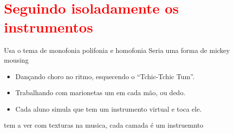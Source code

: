 \newpage

\section{\textcolor{red}{Seguindo isoladamente os instrumentos}}
\label{sec:seguindoinstrumentos}
Usa o tema de monofonia polifonia e homofonia
Seria uma forma de mickey mousing
\begin{itemize}
\item Dançando choro no ritmo, esquecendo o ``Tchic-Tchic Tum''.
\item Trabalhando com marionetas um em cada mão, ou dedo.
\item Cada aluno simula que tem um instrumento virtual e toca ele.
\end{itemize}

tem a ver com texturas na musica, cada camada é um instruemnto


